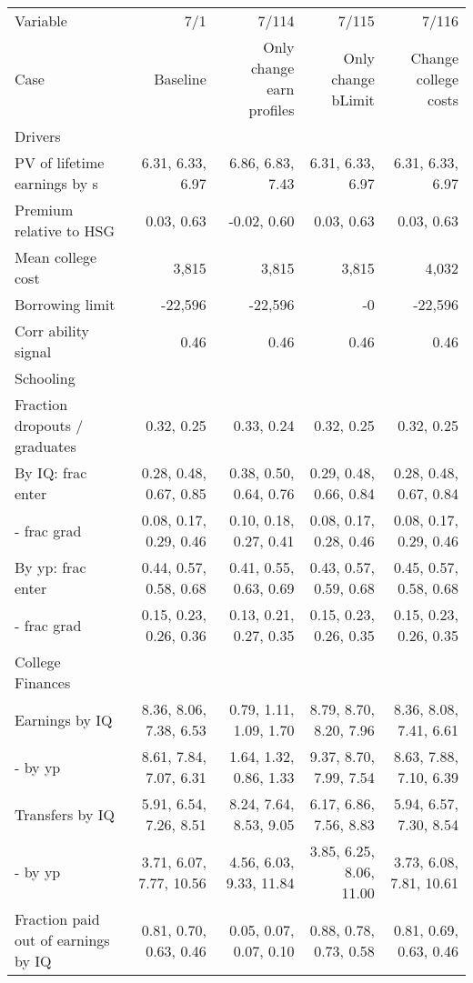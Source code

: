 \begin{tabular}{lrrrr}
\hline
Variable & 7/1  & 7/114  & 7/115  & 7/116  \\
Case & Baseline  & Only change earn profiles  & Only change bLimit  & Change college costs  \\
Drivers &   &   &   &   \\
PV of lifetime earnings by s & 6.31, 6.33, 6.97  & 6.86, 6.83, 7.43  & 6.31, 6.33, 6.97  & 6.31, 6.33, 6.97  \\
Premium relative to HSG & 0.03, 0.63  & -0.02, 0.60  & 0.03, 0.63  & 0.03, 0.63  \\
Mean college cost & 3,815  & 3,815  & 3,815  & 4,032  \\
Borrowing limit & -22,596  & -22,596  & -0  & -22,596  \\
Corr ability signal & 0.46  & 0.46  & 0.46  & 0.46  \\
\hline
Schooling &   &   &   &   \\
Fraction dropouts / graduates & 0.32, 0.25  & 0.33, 0.24  & 0.32, 0.25  & 0.32, 0.25  \\
By IQ: frac enter & 0.28, 0.48, 0.67, 0.85  & 0.38, 0.50, 0.64, 0.76  & 0.29, 0.48, 0.66, 0.84  & 0.28, 0.48, 0.67, 0.84  \\
- frac grad & 0.08, 0.17, 0.29, 0.46  & 0.10, 0.18, 0.27, 0.41  & 0.08, 0.17, 0.28, 0.46  & 0.08, 0.17, 0.29, 0.46  \\
By yp: frac enter & 0.44, 0.57, 0.58, 0.68  & 0.41, 0.55, 0.63, 0.69  & 0.43, 0.57, 0.59, 0.68  & 0.45, 0.57, 0.58, 0.68  \\
- frac grad & 0.15, 0.23, 0.26, 0.36  & 0.13, 0.21, 0.27, 0.35  & 0.15, 0.23, 0.26, 0.35  & 0.15, 0.23, 0.26, 0.35  \\
\hline
College Finances &   &   &   &   \\
Earnings by IQ & 8.36, 8.06, 7.38, 6.53  & 0.79, 1.11, 1.09, 1.70  & 8.79, 8.70, 8.20, 7.96  & 8.36, 8.08, 7.41, 6.61  \\
- by yp & 8.61, 7.84, 7.07, 6.31  & 1.64, 1.32, 0.86, 1.33  & 9.37, 8.70, 7.99, 7.54  & 8.63, 7.88, 7.10, 6.39  \\
Transfers by IQ & 5.91, 6.54, 7.26, 8.51  & 8.24, 7.64, 8.53, 9.05  & 6.17, 6.86, 7.56, 8.83  & 5.94, 6.57, 7.30, 8.54  \\
- by yp & 3.71, 6.07, 7.77, 10.56  & 4.56, 6.03, 9.33, 11.84  & 3.85, 6.25, 8.06, 11.00  & 3.73, 6.08, 7.81, 10.61  \\
Fraction paid out of earnings by IQ & 0.81, 0.70, 0.63, 0.46  & 0.05, 0.07, 0.07, 0.10  & 0.88, 0.78, 0.73, 0.58  & 0.81, 0.69, 0.63, 0.46  \\

\end{tabular}
